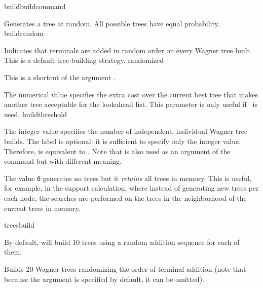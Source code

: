 \begin{command}{build}{buildcommand}
\begin{arguments}
            {Generates a tree at random. All possible trees have equal probability.}
            {buildrandom}

            {Indicates that terminals are added in random order on every Wagner tree built. 
            This is a default tree-building strategy.}
            {randomized}

            {This is a shortcut of the argument .}
            {}

            {The numerical value specifies the extra cost over the current best
            tree that makes another tree acceptable for the lookahead list. This 
            parameter is only useful if~ is used.}
            {buildthreshold}
            
            {The integer value specifies the number of independent, individual
            Wagner tree builds. The label  is optional: it is
            sufficient to specify only the integer value. Therefore,  is
            equivalent to .  Note that   is
            also used as an argument of the command 
            but with different meaning.
            
            The value \texttt{0} generates no trees but it \emph{retains} all trees in memory.
            This is useful, for example, in the  support calculation,
            where instead of generating new trees per each node, the searches are
            performed on the trees in the neighborhood of the current trees in memory.}
            {treesbuild}
            

   \end{arguments}
      
       {By default, \poy will build 10 trees using a random addition sequence for
       each of them.}

	\begin{poyexamples}
            {Builds 20 Wagner trees randomizing the order of terminal
            addition (note that because the argument  
            is specified by default, it can be omitted).}
           

\end{poyexamples}
\end{command}
